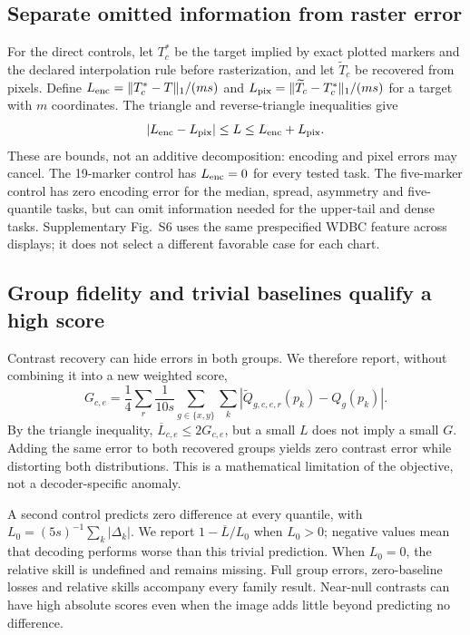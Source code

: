 \documentclass[11pt]{article}
\begin{document}
\subsection*{Separate omitted information from raster error}
For the direct controls, let $T_c^*$ be the target implied by exact plotted markers and the declared interpolation rule before rasterization, and let $\widetilde T_c$ be recovered from pixels. Define $L_{\rm enc}=\|T_c^*-T\|_1/(ms)$ and $L_{\rm pix}=\|\widetilde T_c-T_c^*\|_1/(ms)$ for a target with $m$ coordinates. The triangle and reverse-triangle inequalities give
\[
 |L_{\rm enc}-L_{\rm pix}|\leq L\leq L_{\rm enc}+L_{\rm pix}.
\]
These are bounds, not an additive decomposition: encoding and pixel errors may cancel. The 19-marker control has $L_{\rm enc}=0$ for every tested task. The five-marker control has zero encoding error for the median, spread, asymmetry and five-quantile tasks, but can omit information needed for the upper-tail and dense tasks. Supplementary Fig.~S6 uses the same prespecified WDBC feature across displays; it does not select a different favorable case for each chart.


\clearpage
\subsection*{Group fidelity and trivial baselines qualify a high score}
Contrast recovery can hide errors in both groups. We therefore report, without combining it into a new weighted score,
\begin{equation}
G_{c,e}=\frac{1}{4}\sum_r\frac{1}{10s}\sum_{g\in\{x,y\}}\sum_k|\widetilde Q_{g,c,e,r}(p_k)-Q_g(p_k)|.
\end{equation}
By the triangle inequality, $\overline L_{c,e}\leq2G_{c,e}$, but a small $L$ does not imply a small $G$. Adding the same error to both recovered groups yields zero contrast error while distorting both distributions. This is a mathematical limitation of the objective, not a decoder-specific anomaly.

A second control predicts zero difference at every quantile, with $L_0=(5s)^{-1}\sum_k|\Delta_k|$. We report $1-\overline L/L_0$ when $L_0>0$; negative values mean that decoding performs worse than this trivial prediction. When $L_0=0$, the relative skill is undefined and remains missing. Full group errors, zero-baseline losses and relative skills accompany every family result. Near-null contrasts can have high absolute scores even when the image adds little beyond predicting no difference.
\end{document}
